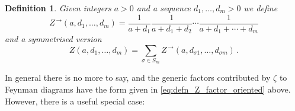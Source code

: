 \documentclass[english,letter paper,12pt,leqno]{article}
\theoremstyle{example}
\newtheorem{definition}[theorem]{Definition}
\numberwithin{equation}{section}
\def\be{\begin{equation}}
\def\ee{\end{equation}}
\begin{document}
\begin{definition}\label{defn:Z_factors} Given integers $a > 0$ and a sequence $d_1, \ldots, d_m > 0$ we define
\be\label{eq:defn_Z_factor_oriented}
Z^{\,\rightarrow}(a,d_1,\ldots,d_m) = \frac{1}{a + d_1} \frac{1}{a + d_1 + d_{2}} \cdots \frac{1}{a + d_1 + \cdots + d_m}
\ee
and a symmetrised version
\be
Z(a,d_1,\ldots,d_m) = \sum_{\sigma \in S_m} Z^{\,\rightarrow}(a,d_{\sigma 1},\ldots,d_{\sigma m})\,.%
\ee
\end{definition}

In general there is no more to say, and the generic factors contributed by $\zeta$ to Feynman diagrams have the form given in \eqref{eq:defn_Z_factor_oriented} above. However, there is a useful special case:
\end{document}
